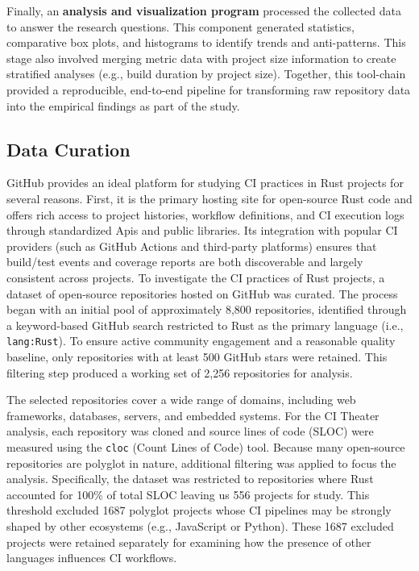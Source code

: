 \documentclass[11pt]{article}
\begin{document}
Finally, an \textbf{analysis and visualization program} processed the collected data to answer the research questions. This component generated statistics, comparative box plots, and histograms to identify trends and anti-patterns. This stage also involved merging metric data with project size information to create stratified analyses (e.g., build duration by project size). Together, this tool-chain provided a reproducible, end-to-end pipeline for transforming raw repository data into the empirical findings as part of the study.

\subsection{Data Curation}
GitHub provides an ideal platform for studying CI practices in Rust projects for several reasons. First, it is the primary hosting site for open-source Rust code and offers rich access to project histories, workflow definitions, and CI execution logs through standardized Apis and public libraries. Its integration with popular CI providers (such as GitHub Actions and third-party platforms) ensures that build/test events and coverage reports are both discoverable and largely consistent across projects. To investigate the CI practices of Rust projects, a dataset of open-source repositories hosted on GitHub was curated. The process began with an initial pool of approximately 8,800 repositories, identified through a keyword-based GitHub search restricted to Rust as the primary language (i.e., \texttt{lang:Rust}). To ensure active community engagement and a reasonable quality baseline, only repositories with at least 500 GitHub stars were retained. This filtering step produced a working set of 2,256 repositories for analysis.

The selected repositories cover a wide range of domains, including web frameworks, databases, servers, and embedded systems. For the CI Theater analysis, each repository was cloned and source lines of code (SLOC) were measured using the \texttt{cloc} (Count Lines of Code) tool. Because many open-source repositories are polyglot in nature, additional filtering was applied to focus the analysis. Specifically, the dataset was restricted to repositories where Rust accounted for 100\% of total SLOC leaving us 556 projects for study. This threshold excluded 1687 polyglot projects whose CI pipelines may be strongly shaped by other ecosystems (e.g., JavaScript or Python). These 1687 excluded projects were retained separately for examining how the presence of other languages influences CI workflows.
\end{document}
